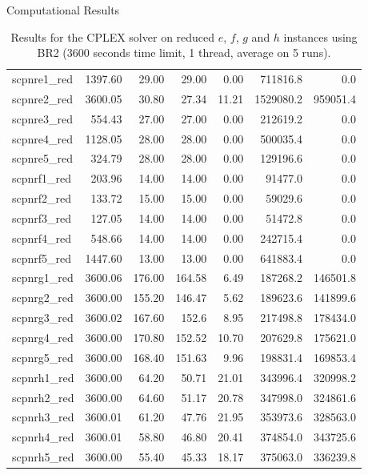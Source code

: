 \documentclass[a4paper,12pt]{mydeitesi_eng}
\begin{document}
\begin{chapter}{Computational Results}
\begin{table}[h]
\begin{center}
\begin{tabular}{l|r|r|r|r|r|r}
scpnre1\_red & 1397.60 & 29.00 & 29.00 & 0.00 & 711816.8 & 0.0\\ 
scpnre2\_red & 3600.05 & 30.80 & 27.34 & 11.21 & 1529080.2 & 959051.4\\ 
scpnre3\_red & 554.43 & 27.00 & 27.00 & 0.00 & 212619.2 & 0.0\\ 
scpnre4\_red & 1128.05 & 28.00 & 28.00 & 0.00 & 500035.4 & 0.0\\ 
scpnre5\_red & 324.79 & 28.00 & 28.00 & 0.00 & 129196.6 & 0.0\\
\hline
 
scpnrf1\_red & 203.96 & 14.00 & 14.00 & 0.00 & 91477.0 & 0.0\\ 
scpnrf2\_red & 133.72 & 15.00 & 15.00 & 0.00 & 59029.6 & 0.0\\ 
scpnrf3\_red & 127.05 & 14.00 & 14.00 & 0.00 & 51472.8 & 0.0\\ 
scpnrf4\_red & 548.66 & 14.00 & 14.00 & 0.00 & 242715.4 & 0.0\\ 
scpnrf5\_red & 1447.60 & 13.00 & 13.00 & 0.00 & 641883.4 & 0.0\\
\hline
 
scpnrg1\_red & 3600.06 & 176.00 & 164.58 & 6.49 & 187268.2 & 146501.8\\ 
scpnrg2\_red & 3600.00 & 155.20 & 146.47 & 5.62 & 189623.6 & 141899.6\\ 
scpnrg3\_red & 3600.02 & 167.60 & 152.6 & 8.95 & 217498.8 & 178434.0\\ 
scpnrg4\_red & 3600.00 & 170.80 & 152.52 & 10.70 & 207629.8 & 175621.0\\ 
scpnrg5\_red & 3600.00 & 168.40 & 151.63 & 9.96 & 198831.4 & 169853.4\\
\hline
 
scpnrh1\_red & 3600.00 & 64.20 & 50.71 & 21.01 & 343996.4 & 320998.2\\ 
scpnrh2\_red & 3600.00 & 64.60 & 51.17 & 20.78 & 347998.0 & 324861.6\\ 
scpnrh3\_red & 3600.01 & 61.20 & 47.76 & 21.95 & 353973.6 & 328563.0\\ 
scpnrh4\_red & 3600.01 & 58.80 & 46.80 & 20.41 & 374854.0 & 343725.6\\ 
scpnrh5\_red & 3600.00 & 55.40 & 45.33 & 18.17 & 375063.0 & 336239.8\\
\end{tabular}
\end{center}
\caption{Results for the CPLEX solver on reduced $e$, $f$, $g$ and $h$ instances using BR2 (3600 seconds time limit, 1 thread, average on 5  runs).}
\label{tab:ResultBR2}
\end{table}


\end{chapter}
\end{document}
